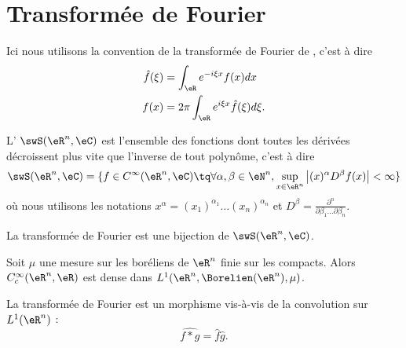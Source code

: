 \section{Transformée de Fourier}

Ici nous utilisons la convention de la transformée de Fourier de , c'est à dire
\begin{subequations}
    \begin{align}
        \hat f(\xi)&=\int_{\eR} e^{-i\xi x}f(x)dx\\
        f(x)&=2\pi\int_{\eR} e^{i\xi x}\hat f(\xi)d\xi.
    \end{align}
\end{subequations}

L' \( \swS(\eR^n,\eC)\) est l'ensemble des fonctions dont toutes les dérivées décroissent plus vite que l'inverse de tout polynôme, c'est à dire
\begin{equation}
    \swS(\eR^n,\eC)=\{ f\in C^{\infty}(\eR^n,\eC)\tq \forall \alpha,\beta\in \eN^n,\sup_{x\in \eR^n}\big| (x)^{\alpha}D^{\beta}f(x) \big|<\infty \}
\end{equation}
où nous utilisons les notations \( x^{\alpha}=(x_1)^{\alpha_1}\ldots (x_n)^{\alpha_n}\) et \( D^{\beta}=\frac{ \partial^n  }{ \partial \beta_1\ldots\partial \beta_n }\).

\begin{proposition}
    La transformée de Fourier est une bijection de \( \swS(\eR^n,\eC)\).    
\end{proposition}

\begin{theorem}      \label{ThoRWEoqY}
    Soit \( \mu\) une mesure sur les boréliens de \( \eR^n\) finie sur les compacts. Alors \( C^{\infty}_c(\eR^n,\eR)\) est dense dans \( L^1(\eR^n,\Borelien(\eR^n),\mu)\).
\end{theorem}

\begin{proposition}     \label{PropfqvLOl}
    La transformée de Fourier est un morphisme vis-à-vis de la convolution sur \( L^1(\eR^n)\) :
    \begin{equation}
        \widehat{f*g}=\hat f\hat g.
    \end{equation}
\end{proposition}

